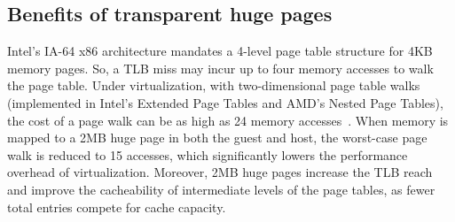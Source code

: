 %
%
%
\subsection{Benefits of transparent huge pages}
Intel's IA-64 x86 architecture mandates a 4-level page table structure for 4KB
memory pages.  So, a TLB miss may incur up to four memory accesses to walk the page table. 
Under virtualization, with two-dimensional page table walks (implemented in Intel's
Extended Page Tables and AMD's Nested Page Tables), the cost of a page walk can be as high as
24 memory accesses~\cite{Intel-sw-manual, AMD-NPT}.  When memory is mapped to a 2MB 
huge page in both the guest and host, the worst-case page walk is reduced to 15 accesses, which 
significantly lowers the performance overhead of virtualization. Moreover,
2MB huge pages increase the TLB reach and improve the cacheability of intermediate
levels of the page tables, as fewer total entries compete for cache capacity. 

